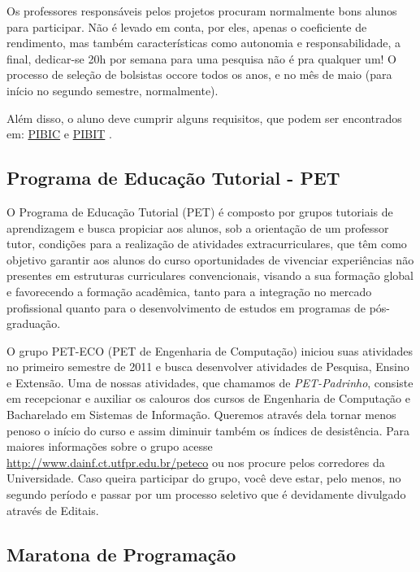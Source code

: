 \documentclass[a4paper,12pt,openany]{article}
\begin{document}
Os professores responsáveis pelos projetos procuram normalmente bons alunos para participar. Não é levado em conta, por eles, apenas o coeficiente de rendimento, mas também características como autonomia e responsabilidade, a final, dedicar-se 20h por semana para uma pesquisa não é pra qualquer um! O processo de seleção de bolsistas occore todos os anos, e no mês de maio (para início no segundo semestre, normalmente).

Além disso, o aluno deve cumprir alguns requisitos, que podem ser encontrados em: \href{http://www.utfpr.edu.br/pesquisa/bolsas/pibic-1}{PIBIC} e \href{http://www.utfpr.edu.br/pesquisa/bolsas/pibiti-1}{PIBIT} .

\subsection{Programa de Educação Tutorial - PET}

O Programa de Educação Tutorial (PET) é composto por grupos tutoriais de aprendizagem e busca propiciar aos alunos, sob a orientação de um professor tutor, condições para a realização de atividades extracurriculares, que têm como objetivo garantir aos alunos do curso oportunidades de vivenciar experiências não presentes em estruturas curriculares convencionais, visando a sua formação global e favorecendo a formação acadêmica, tanto para a integração no mercado profissional quanto para o desenvolvimento de estudos em programas de pós-graduação.

O grupo PET-ECO (PET de Engenharia de Computação) iniciou suas atividades no primeiro semestre de 2011 e busca desenvolver atividades de Pesquisa, Ensino e Extensão. Uma de nossas atividades, que chamamos de \textit{PET-Padrinho}, consiste em recepcionar e auxiliar os calouros dos cursos de Engenharia de Computação e Bacharelado em Sistemas de Informação. Queremos através dela tornar menos penoso o início do curso e assim diminuir também os índices de desistência. Para maiores informações sobre o grupo acesse \href{http://www.dainf.ct.utfpr.edu.br/peteco}{http://www.dainf.ct.utfpr.edu.br/peteco} ou nos procure pelos corredores da Universidade. Caso queira participar do grupo, você deve estar, pelo menos, no segundo período e passar por um processo seletivo que é devidamente divulgado através de Editais.

\subsection{Maratona de Programação}
\end{document}
